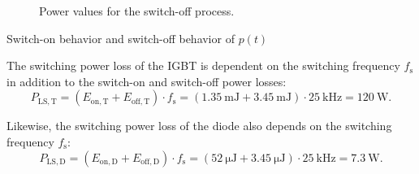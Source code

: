 \begin{solutionblock}
\begin{solutionfigure}[h]
\begin{subfigure}[t]{0.45\textwidth}
        \caption{Power values for the switch-off process.}
        \label{fig:Power values for the switch-off process}
    \end{subfigure}
    \caption{Switch-on behavior and switch-off behavior of $p(t)$}
\end{solutionfigure}
\end{solutionblock}


\begin{solutionblock}
The switching power loss of the IGBT is dependent on the switching frequency $f_{\mathrm{s}}$ in addition to the switch-on and switch-off power losses:
\begin{equation}
    P_{\mathrm{LS,T}} =  (E_{\mathrm{on,T}} +  E_{\mathrm{off,T}}) \cdot f_{\mathrm{s}} = (\SI {1.35}{\milli\joule} + \SI {3.45}{\milli\joule}) \cdot \SI {25}{\kilo\hertz} = \SI {120}{\watt}.
 \end{equation}

 Likewise, the switching power loss of the diode also depends on the switching frequency $f_{\mathrm{s}}$:
 \begin{equation}
    P_{\mathrm{LS,D}} =  (E_{\mathrm{on,D}} +  E_{\mathrm{off,D}}) \cdot f_{\mathrm{s}} = (\SI {52}{\micro\joule} + \SI {3.45}{\micro\joule}) \cdot \SI {25}{\kilo\hertz} = \SI {7.3}{\watt}.
 \end{equation}
\end{solutionblock}


